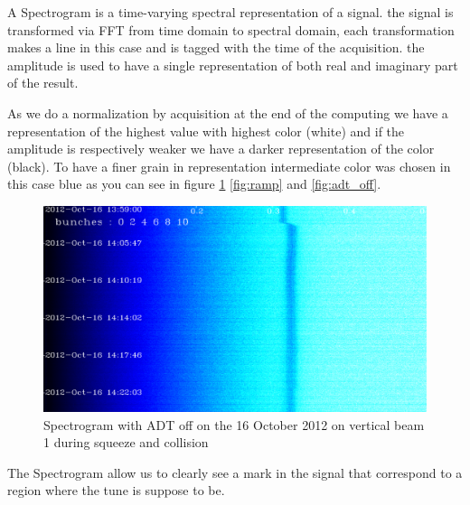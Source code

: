 A Spectrogram is a time-varying spectral representation of a signal. the signal is transformed via \gls{FFT} from time domain to spectral domain, each transformation makes a line in this case and is tagged with the time of the acquisition. the amplitude is used to have a single representation of both real and imaginary part of the result.

As we do a normalization by acquisition at the end of the computing we have a representation of the highest value with highest color (white) and if the amplitude is respectively weaker we have a darker representation of the color (black). To have a finer grain in representation intermediate color was chosen in this case blue as you can see in figure \ref{fig:squeeze} \ref{fig:ramp} and \ref{fig:adt_off}.

\begin{figure}[H]
	\caption{Spectrogram with ADT off on the 16 October 2012 on vertical beam 1 during squeeze and collision}
	\label{fig:squeeze}
	\centering
	\includegraphics[scale=0.3]{md-121016-vb1-m1-6bunches-10acc-1359-1425-collision.pdf}
\end{figure}

The Spectrogram allow us to clearly see a mark in the signal that correspond to a region where the tune is suppose to be.